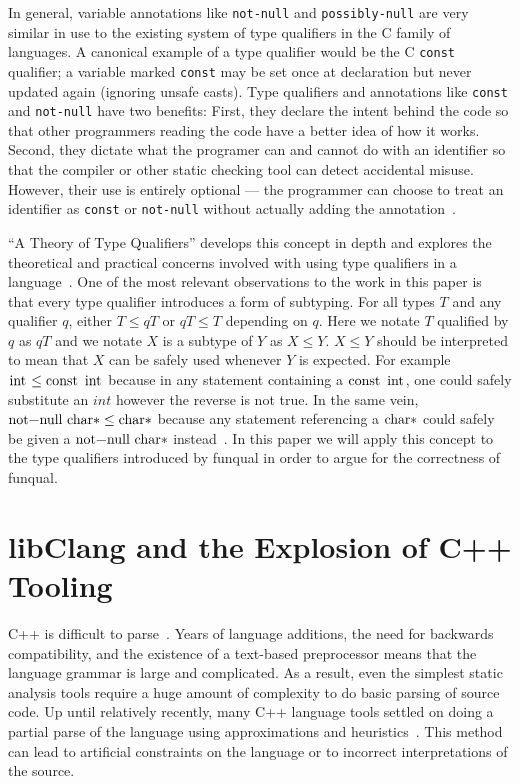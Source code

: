 In general, variable annotations like \lstinline{not-null} and \lstinline{possibly-null} are very similar in use to the existing system of type qualifiers in the C family of languages.  A canonical example of a type qualifier would be the C \lstinline{const} qualifier; a variable marked \lstinline{const} may be set once at declaration but never updated again (ignoring unsafe casts).  Type qualifiers and annotations like \lstinline{const} and \lstinline{not-null} have two benefits:  First, they declare the intent behind the code so that other programmers reading the code have a better idea of how it works.  Second, they dictate what the programer can and cannot do with an identifier so that the compiler or other static checking tool can detect accidental misuse.  However, their use is entirely optional --- the programmer can choose to treat an identifier as \lstinline{const} or \lstinline{not-null} without actually adding the annotation~\cite{theory-of-qual}.

``A Theory of Type Qualifiers'' develops this concept in depth and explores the theoretical and practical concerns involved with using type qualifiers in a language~\cite{theory-of-qual}.  One of the most relevant observations to the work in this paper is that every type qualifier introduces a form of subtyping.  For all types $T$ and any qualifier $q$, either $T \leq q T$ or $q T \leq T$ depending on $q$.  Here we notate $T$ qualified by $q$ as $q T$ and we notate $X$ is a subtype of $Y$ as $X \leq Y$.  $X \leq Y$ should be interpreted to mean that $X$ can be safely used whenever $Y$ is expected.  For example $\lstinline{int} \leq \lstinline{const int}$ because in any statement containing a $\lstinline{const int}$, one could safely substitute an $int$ however the reverse is not true.  In the same vein, $\lstinline{not-null char*} \leq \lstinline{char*}$ because any statement referencing a $\lstinline{char*}$ could safely be given a $\lstinline{not-null char*}$ instead~\cite{theory-of-qual}.  In this paper we will apply this concept to the type qualifiers introduced by funqual in order to argue for the correctness of funqual.  

\section{libClang and the Explosion of C++ Tooling}\label{sec:related:libclang}

C++ is difficult to parse~\cite{cpp-sucks, libclang-survey, mozilla-pork, parse-cpp}.  Years of language additions, the need for backwards compatibility, and the existence of a text-based preprocessor means that the language grammar is large and complicated.  As a result, even the simplest static analysis tools require a huge amount of complexity to do basic parsing of source code.  Up until relatively recently, many C++ language tools settled on doing a partial parse of the language using approximations and heuristics~\cite{libclang-survey}.  This method can lead to artificial constraints on the language or to incorrect interpretations of the source.  

